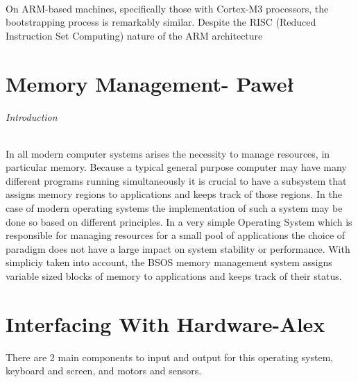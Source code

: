 \documentclass[english]{paper}
\begin{document}
\paragraph{}
On ARM-based machines, specifically those with Cortex-M3 processors, the bootstrapping process is remarkably similar. Despite the RISC (Reduced Instruction Set Computing) nature of the ARM architecture


\part{Memory Management- Pawe\l{}}

\paragraph{Introduction}
In all modern computer systems arises the necessity to manage resources, in particular memory. Because a typical general purpose computer
may have many different programs running simultaneously it is crucial to have a subsystem that assigns memory regions to applications and keeps
track of those regions. In the case of modern operating systems the implementation of such a system may be done so based on different principles.
In a very simple Operating System which is responsible for managing resources for a small pool of applications the choice of paradigm does not have a large impact on system stability or performance.
With simpliciy taken into account, the BSOS memory management system assigns variable sized blocks of memory to applications and keeps track of their status.


\part{Interfacing With Hardware-Alex}
There are 2 main components to input and output for this operating system, keyboard and screen, and motors and sensors.
\end{document}
